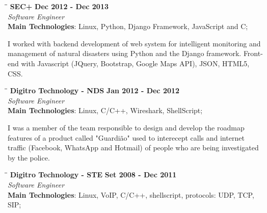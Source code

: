 \documentclass[margin]{res}
\begin{document}
\begin{resume}
\vspace{-0.1in}
   \begin{tabbing}
   \hspace{2.3in}\= \hspace{1.7in}\= \kill %
    \textbf{SEC+}    \>\>\textbf{Dec 2012 - Dec 2013}\\
    \textit{Software Engineer}\\        
    \textbf{Main Technologies}: Linux, Python, Django Framework, JavaScript and C;
   \end{tabbing}\vspace{-20pt}      %
    \vspace{2mm}
     I worked with backend development of web system for intelligent monitoring 
     and management of natural disasters using Python and the Django framework. 
     Front-end with Javascript (JQuery, Bootstrap, Google Maps API),
     JSON, HTML5, CSS.

   \begin{tabbing}
   \hspace{2.3in}\= \hspace{1.7in}\= \kill %
    \textbf{Digitro Technology - NDS}    \>\>\textbf{Jan 2012 - Dec 2012}\\
    \textit{Software Engineer}\\   
    \textbf{Main Technologies}: Linux, C/C++, Wireshark, ShellScript;
   \end{tabbing}\vspace{-20pt}      %
    \vspace{2mm}
    I was a member of the team responsible to design and develop the roadmap features of a product called
    "Guardião" used to interecept calls and internet traffic (Facebook, WhatsApp and Hotmail) of people who are        being investigated by the police.

   \begin{tabbing}
   \hspace{2.3in}\= \hspace{1.5in}\= \kill %
    \textbf{Digitro Technology - STE}    \>\>\textbf{Set 2008 - Dec 2011}\\
    \textit{Software Engineer}\\   
    \textbf{Main Technologies}: Linux, VoIP, C/C++, shellscript, protocols: UDP, TCP, SIP;
   \end{tabbing}\vspace{-20pt}      %
    \vspace{2mm}
    

\end{resume}
\end{document}
